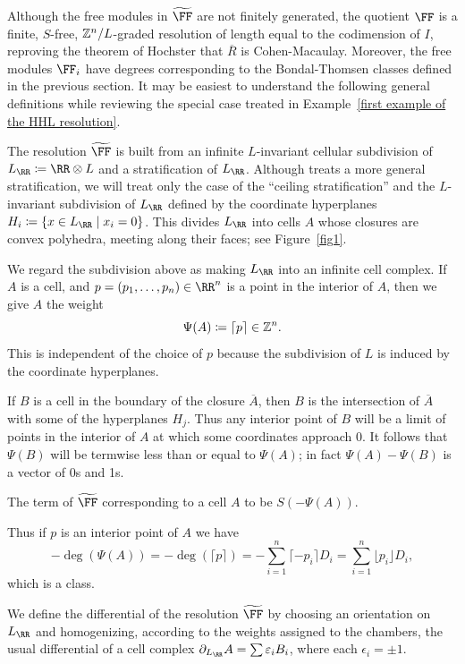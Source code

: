 \documentclass{amsart}
\begin{document}
Although the free modules in $\tF$ are not finitely generated, the quotient $\FF$
is a finite, $S$-free, $\mathbb Z^{n}/L$-graded resolution of length equal to the 
codimension of $I$, reproving the theorem of Hochster that
$\overline R$ is Cohen-Macaulay. Moreover, the free modules $\FF_{i}$ have degrees
corresponding to the Bondal-Thomsen classes defined in the previous section. It may be easiest to
understand the following general definitions while reviewing the special case treated in Example~\ref{first example of the HHL resolution}.


The resolution $\tF$ is built from an infinite $L$-invariant cellular subdivision of $L_\RR \ce \RR\otimes L$
and a stratification of $L_{\RR}$.  Although \cite{BCHSY} treats a more general stratification, we will
treat only the case of  the ``ceiling stratification'' and the $L$-invariant subdivision of $L_\RR$ defined by the coordinate hyperplanes $H_i \ce \{x\in L_\RR\mid x_i = 0\}$. This divides $L_\RR$ into cells $A$ whose closures are convex polyhedra, meeting along their faces; see Figure~\ref{fig1}.


We regard the subdivision above as making $L_{\RR}$ into an infinite cell complex.
If $A$ is a cell, and $p = (p_1,\dots, p_n) \in \RR^n$ is a point in the
interior of $A$, then we give $A$ the weight 
$$
\Psi(A) \coloneqq \lceil p \rceil \in \mathbb Z^{n}.
$$
This is independent of the choice of $p$ because the subdivision of $L$ is induced by the coordinate hyperplanes.
 
If $B$ is 
a cell in the boundary of the closure $\overline A$, then $B$ is the intersection of
$\overline A$ with some of the hyperplanes $H_{j}$. Thus any interior point of $B$ will
be a limit of points in the interior of $A$ at which some coordinates approach $0$. It follows that
$\Psi(B)$ will be termwise less than or equal to $\Psi(A)$; in fact $\Psi(A) - \Psi(B)$ is a vector
of 0s and 1s.

\begin{defn}\label{def of F}
 The term of $\tF$ corresponding to a cell $A$  to be $S(-\Psi(A))$. 

Thus if $p$ is an interior point of $A$
we have
\[
-\deg(\Psi(A)) = -\deg( \lceil {p}\rceil) = -\sum_{i=1}^n\lceil -p_i\rceil D_i=\sum_{i=1}^n\lfloor p_i\rfloor D_i,
\] 
which is a \BT class.

 We define the differential of the resolution $\tF$ by choosing
an orientation on $L_\RR$ and homogenizing, according to the weights assigned to the chambers, the usual differential of
a cell complex $\partial_{L_{\RR}}A = \sum\epsilon_{i}B_{i}$, where each $\epsilon_{i} = \pm 1$. 
\end{defn}
\end{document}
